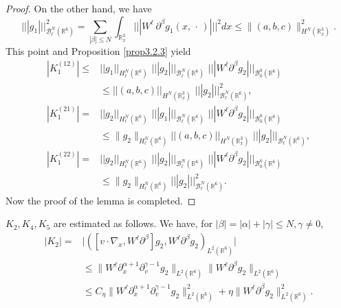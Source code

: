 \documentclass{amsart}[12pt, article]
\begin{document}
\begin{proof}
On the other hand,
we have
\[
||| g_1|||_{{{\mathcal B}}^{N}_\ell({{{\mathbb R}}}^6)}^2=
 \sum_{|\beta| \le N} \int_{{{{\mathbb R}}}^3_x} |||W^\ell\,
{{\partial}}^\beta g_1(x,\, \cdot\,)|||^2dx
\le \|(a,b,c)\|^2_{H^N({{{\mathbb R}}}^3_x)}.
\]
This point and  Proposition \ref{prop3.2.3}  yield
 \begin{align*}
|K_1^{(12)}|\le &||g_1||_{H^N_\ell({{{\mathbb R}}}^6)}\,\,
||| g_2|||_{{{\mathcal B}}^{N}_\ell({{{\mathbb R}}}^6)}\,\, ||| W^\ell{{\partial}}^\beta g_2|||_{{{\mathcal B}}^0_0({{{\mathbb R}}}^6)}
\\&
 \leq  ||(a,b,c)||_{H^N({{{\mathbb R}}}^3_x)}\,\,
 ||| g_2|||_{{{\mathcal B}}^{N}_\ell({{{\mathbb R}}}^6)}^2,
\\
|K_1^{(21)}|=&||g_2||_{H^N_\ell({{{\mathbb R}}}^6)}\,\,
||| g_1|||_{{{\mathcal B}}^{N}_\ell({{{\mathbb R}}}^6)}\,\, ||| W^\ell{{\partial}}^\beta g_2|||_{{{\mathcal B}}^0_0({{{\mathbb R}}}^6)}
\\&
 \leq \|g_2\|_{H^N_\ell({{{\mathbb R}}}^6)} ||(a,b,c)||_{H^N({{{\mathbb R}}}^3_x)}\,\,
 ||| g_2|||_{{{\mathcal B}}^{N}_\ell({{{\mathbb R}}}^6)},
 \\
 |K_1^{(22)}|=&||g_2||_{H^N_\ell({{{\mathbb R}}}^6)}\,\,
||| g_2|||_{{{\mathcal B}}^{N}_\ell({{{\mathbb R}}}^6)}\,\, ||| W^\ell{{\partial}}^\beta g_2|||_{{{\mathcal B}}^0_0({{{\mathbb R}}}^6)}
\\&
 \leq \|g_2\|_{H^N_\ell({{{\mathbb R}}}^6)}
 ||| g_2|||_{{{\mathcal B}}^{N}_\ell({{{\mathbb R}}}^6)}^2.
 \end{align*}
 Now the proof of the lemma is completed.
 \end{proof}

$K_2,K_4, K_5$ are estimated as follows. We have, for
$|\beta|=|\alpha|+|\gamma|\le N, \gamma\not=0$,
 \begin{align*}
 |K_2|=&\big|([v\cdot\nabla_x, W^\ell{{\partial}}^\beta]g_2, W^\ell{{\partial}}^\beta g_2)_{L^2({{{\mathbb R}}}^6)}
 \big|
 \\&
 \le \|W^\ell{{\partial}}_x^{\alpha+1}{{\partial}}_v^{\gamma-1}g_2\|_{L^2({{{\mathbb R}}}^6)}
\|W^\ell{{\partial}}^\beta g_2\|_{L^2({{{\mathbb R}}}^6)}
\\
&\le  C_\eta\|W^\ell{{\partial}}_x^{\alpha+1}{{\partial}}_v^{\gamma-1}g_2\|_{L^2({{{\mathbb R}}}^6)}^2+\eta
\|W^\ell{{\partial}}^\beta g_2\|_{L^2({{{\mathbb R}}}^6)}^2.
\end{align*}
\end{document}
